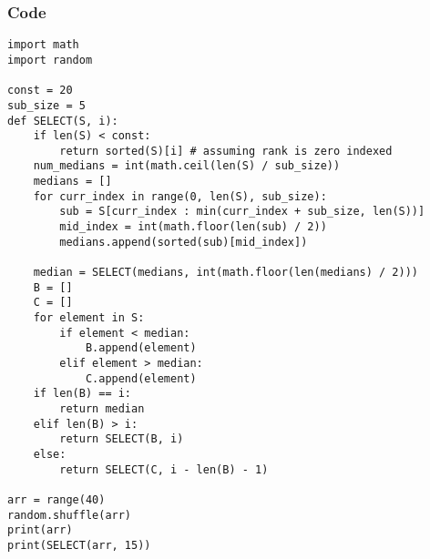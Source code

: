 \documentclass[12pt]{article}
\begin{document}
\subsubsection*{Code}
\begin{lstlisting}
import math
import random

const = 20
sub_size = 5
def SELECT(S, i):
	if len(S) < const:
		return sorted(S)[i] # assuming rank is zero indexed
	num_medians = int(math.ceil(len(S) / sub_size))
	medians = []
	for curr_index in range(0, len(S), sub_size):
		sub = S[curr_index : min(curr_index + sub_size, len(S))]
		mid_index = int(math.floor(len(sub) / 2))
		medians.append(sorted(sub)[mid_index])

	median = SELECT(medians, int(math.floor(len(medians) / 2)))
	B = []
	C = []
	for element in S:
		if element < median:
			B.append(element)
		elif element > median:
			C.append(element)
	if len(B) == i:
		return median
	elif len(B) > i:
		return SELECT(B, i)
	else:
		return SELECT(C, i - len(B) - 1)

arr = range(40)
random.shuffle(arr)
print(arr)
print(SELECT(arr, 15))
\end{lstlisting}
\end{document}
